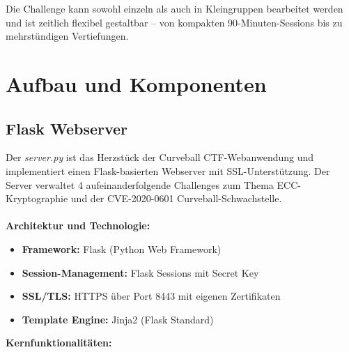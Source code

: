 \documentclass{article}
\begin{document}
\noindent
Die Challenge kann sowohl einzeln als auch in Kleingruppen bearbeitet werden und ist zeitlich flexibel gestaltbar – von kompakten 90-Minuten-Sessions bis zu mehrstündigen Vertiefungen.

\newpage
\section{Aufbau und Komponenten}
\subsection{Flask Webserver}
Der \emph{server.py} ist das Herzstück der Curveball CTF-Webanwendung und implementiert einen Flask-basierten Webserver mit SSL-Unterstützung. Der Server verwaltet 4 aufeinanderfolgende Challenges zum Thema ECC-Kryptographie und der CVE-2020-0601 Curveball-Schwachstelle.\\
\\
\textbf{Architektur und Technologie:}
\begin{itemize}
    \item \textbf{Framework:} Flask (Python Web Framework)
    \item \textbf{Session-Management:} Flask Sessions mit Secret Key
    \item \textbf{SSL/TLS:} HTTPS über Port 8443 mit eigenen Zertifikaten
    \item \textbf{Template Engine:} Jinja2 (Flask Standard)
\end{itemize}
\textbf{Kernfunktionalitäten:}
\end{document}
